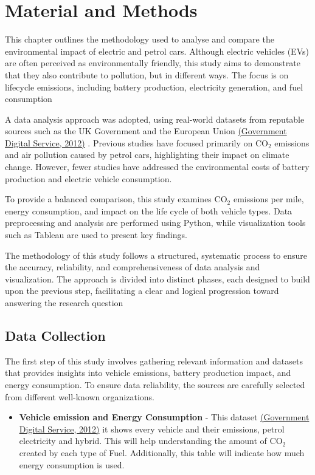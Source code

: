 \chapter{Material and Methods}
\label{ch:method} %



This chapter outlines the methodology used to analyse and compare the environmental impact of electric and petrol cars.
 Although electric vehicles (EVs) are often perceived as environmentally friendly,
 this study aims to demonstrate that they also contribute to pollution, but in different ways.
 The focus is on lifecycle emissions, including battery production, electricity generation, and fuel consumption
 


A data analysis approach was adopted, using real-world datasets from
reputable sources such as the UK Government and the European Union \href{https://www.gov.uk/co2-and-vehicle-tax-tools}{(Government Digital Service, 2012)} . Previous studies have focused primarily on CO$_2$ emissions and air pollution caused by petrol cars, highlighting their impact on climate change.
 However, fewer studies have addressed the environmental costs of battery production and electric vehicle consumption.

To provide a balanced comparison, this study examines
CO$_2$ emissions per mile, energy consumption, and impact on the life cycle of both vehicle types.
Data preprocessing and analysis are performed using Python, while visualization tools such
as Tableau are used to present key findings. 

The methodology of this study follows a structured, systematic process to ensure the accuracy, reliability, and comprehensiveness of data analysis and visualization. The approach is divided into distinct phases, each designed to build upon the previous step, facilitating a clear and logical progression toward answering the research question
\clearpage

\section{Data Collection}
 The first step of this study involves gathering relevant information and datasets that provides insights into vehicle emissions, battery production impact, and energy consumption. To ensure data reliability, the sources are carefully selected from different well-known organizations. 
 \begin{itemize}
     \item \textbf{Vehicle emission and Energy Consumption} - This dataset \href{https://www.gov.uk/co2-and-vehicle-tax-tools}{(Government Digital Service, 2012)} it shows every vehicle and their emissions, petrol electricity and hybrid. This will help understanding the amount of CO$_2$ created by each type of Fuel. Additionally, this table will indicate how much energy consumption is used. 
 \end{itemize}

